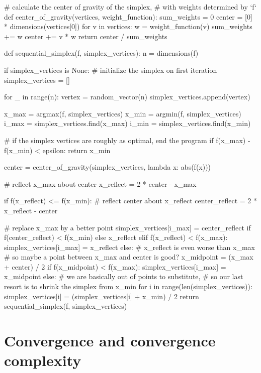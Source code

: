 \begin{python}
# calculate the center of gravity of the simplex,
# with weights determined by `f`
def center_of_gravity(vertices, weight_function):
  sum_weights = 0
  center = [0] * dimensions(vertices[0])
  for v in vertices:
    w = weight_function(v)
    sum_weights += w
    center += v * w
  return center / sum_weights

def sequential_simplex(f, simplex_vertices):
  n = dimensions(f)

  if simplex_vertices is None:
    # initialize the simplex on first iteration
    simplex_vertices = []
  
    for _ in range(n):
      vertex = random_vector(n)
      simplex_vertices.append(vertex)

  x_max = argmax(f, simplex_vertices)
  x_min = argmin(f, simplex_vertices)
  i_max = simplex_vertices.find(x_max)
  i_min = simplex_vertices.find(x_min)

  # if the simplex vertices are roughly as optimal, end the program
  if f(x_max) - f(x_min) < epsilon:
    return x_min

  center = center_of_gravity(simplex_vertices, lambda x: abs(f(x)))

  # reflect x_max about center
  x_reflect = 2 * center - x_max

  if f(x_reflect) <= f(x_min):
    # reflect center about x_reflect
    center_reflect = 2 * x_reflect - center

    # replace x_max by a better point
    simplex_vertices[i_max] = center_reflect if f(center_reflect) < f(x_min)
                                             else x_reflect
  elif f(x_reflect) < f(x_max):
    simplex_vertices[i_max] = x_reflect
  else:
    # x_reflect is even worse than x_max
    # so maybe a point between x_max and center is good?
    x_midpoint = (x_max + center) / 2
    if f(x_midpoint) < f(x_max):
      simplex_vertices[i_max] = x_midpoint
    else:
      # we are basically out of points to substitute,
      # so our last resort is to shrink the simplex from x_min
      for i in range(len(simplex_vertices)):
        simplex_vertices[i] = (simplex_vertices[i] + x_min) / 2
  return sequential_simplex(f, simplex_vertices)
\end{python}



\section{Convergence and convergence complexity} %
\label{sec:Convergence and convergence complexity}

